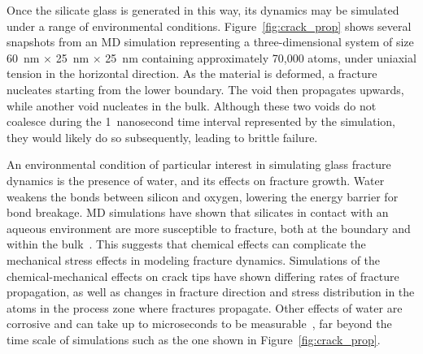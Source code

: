 Once the silicate glass is generated in this way, its dynamics may be simulated under a range of environmental conditions.  Figure~\ref{fig:crack_prop} shows several snapshots from an MD simulation representing a three-dimensional system of size 60~nm $\times$ 25~nm $\times$ 25~nm containing approximately 70,000 atoms, under uniaxial tension in the horizontal direction.  As the material is deformed, a fracture nucleates starting from the lower boundary.  The void then propagates upwards, while another void nucleates in the bulk.  Although these two voids do not coalesce during the 1~nanosecond time interval represented by the simulation, they would likely do so subsequently, leading to brittle failure.

An environmental condition of particular interest in simulating glass fracture dynamics is the presence of water, and its effects on fracture growth. Water weakens the bonds between silicon and oxygen, lowering the energy barrier for bond breakage. MD simulations have shown that silicates in contact with an aqueous environment are more susceptible to fracture, both at the boundary and within the bulk~\cite{chem_effects}. This suggests that chemical effects can complicate the mechanical stress effects in modeling fracture dynamics. Simulations of the chemical-mechanical effects on crack tips have shown differing rates of fracture propagation, as well as changes in fracture direction and stress distribution in the atoms in the process zone where fractures propagate. Other effects of water are corrosive and can take up to microseconds to be measurable~\cite{markpres}, far beyond the time scale of simulations such as the one shown in Figure~\ref{fig:crack_prop}.



